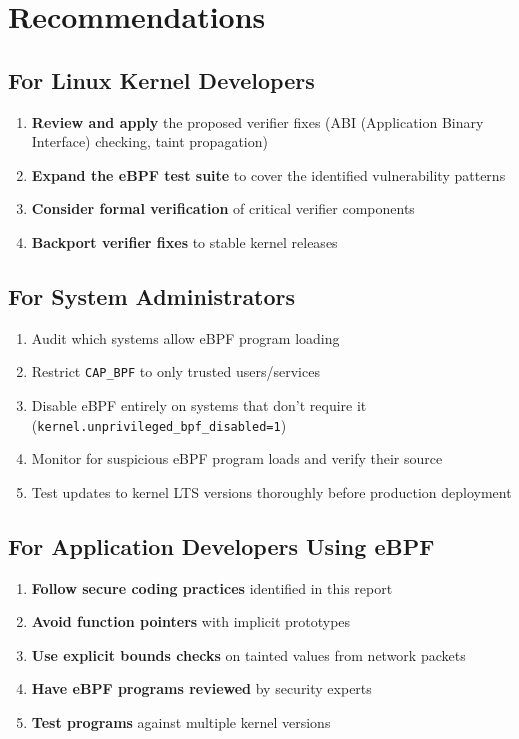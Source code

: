 \section{Recommendations}

\subsection{For Linux Kernel Developers}

\begin{enumerate}[label=\arabic*.]
  \item \textbf{Review and apply} the proposed verifier fixes (ABI (Application Binary Interface) checking, taint propagation)
  \item \textbf{Expand the eBPF test suite} to cover the identified vulnerability patterns
  \item \textbf{Consider formal verification} of critical verifier components
  \item \textbf{Backport verifier fixes} to stable kernel releases
\end{enumerate}

\subsection{For System Administrators}

\begin{enumerate}[label=\arabic*.]
  \item Audit which systems allow eBPF program loading
  \item Restrict \texttt{CAP\_BPF} to only trusted users/services
  \item Disable eBPF entirely on systems that don't require it (\texttt{kernel.unprivileged\_bpf\_disabled=1})
  \item Monitor for suspicious eBPF program loads and verify their source
  \item Test updates to kernel LTS versions thoroughly before production deployment
\end{enumerate}

\subsection{For Application Developers Using eBPF}

\begin{enumerate}[label=\arabic*.]
  \item \textbf{Follow secure coding practices} identified in this report
  \item \textbf{Avoid function pointers} with implicit prototypes
  \item \textbf{Use explicit bounds checks} on tainted values from network packets
  \item \textbf{Have eBPF programs reviewed} by security experts
  \item \textbf{Test programs} against multiple kernel versions
\end{enumerate}

